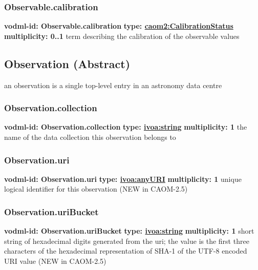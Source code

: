     \subsubsection{Observable.calibration}
      \textbf{vodml-id: Observable.calibration} \newline
      \textbf{type: \hyperref[sect:CalibrationStatus]{caom2:CalibrationStatus}} \newline
      \textbf{multiplicity: 0..1} \newline
      term describing the calibration of the observable values

  \subsection{Observation (Abstract)}
  \label{sect:Observation}
    an observation is a single top-level entry in an astronomy data centre

    \subsubsection{Observation.collection}
      \textbf{vodml-id: Observation.collection} \newline
      \textbf{type: \hyperref[sect:ivoa]{ivoa:string}} \newline
      \textbf{multiplicity: 1} \newline
      the name of the data collection this observation belongs to

    \subsubsection{Observation.uri}
      \textbf{vodml-id: Observation.uri} \newline
      \textbf{type: \hyperref[sect:ivoa]{ivoa:anyURI}} \newline
      \textbf{multiplicity: 1} \newline
      unique logical identifier for this observation (NEW in CAOM-2.5)

    \subsubsection{Observation.uriBucket}
      \textbf{vodml-id: Observation.uriBucket} \newline
      \textbf{type: \hyperref[sect:ivoa]{ivoa:string}} \newline
      \textbf{multiplicity: 1} \newline
      short string of hexadecimal digits generated from the uri; the value is the first three characters of the hexadecimal representation of SHA-1 of the UTF-8 encoded URI value (NEW in CAOM-2.5)

